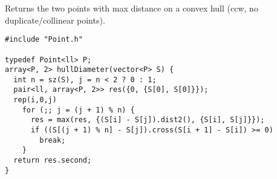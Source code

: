 Returns the two points with max distance on a convex hull (ccw, no duplicate/collinear points).
\begin{verbatim}
#include "Point.h"

typedef Point<ll> P;
array<P, 2> hullDiameter(vector<P> S) {
  int n = sz(S), j = n < 2 ? 0 : 1;
  pair<ll, array<P, 2>> res({0, {S[0], S[0]}});
  rep(i,0,j)
    for (;; j = (j + 1) % n) {
      res = max(res, {(S[i] - S[j]).dist2(), {S[i], S[j]}});
      if ((S[(j + 1) % n] - S[j]).cross(S[i + 1] - S[i]) >= 0)
        break;
    }
  return res.second;
}

\end{verbatim}
